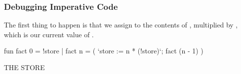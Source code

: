 \documentclass[aspectratio=169]{beamer}
\begin{document}
\begin{frame}[fragile]
  \frametitle{Debugging Imperative Code}

  \begin{minipage}[t][0.6in][t]{\textwidth}
  The first thing to happen is that we assign  to the contents
  of , multiplied by , which is our current value of
  .
  \end{minipage}

  \vspace{10pt}

  \begin{center}
    \begin{minipage}[t][1.7in][t]{0.6\textwidth}
      \vspace{\fill}
      \begin{codeblock}
        fun fact 0 = !store
          | fact n =
              ( `store := n * (!store)`;
                fact (n - 1)
              )
      \end{codeblock}
      \vspace{\fill}
    \end{minipage}
    \hfill\vline\hfill
    \begin{minipage}[t][1.7in][t]{0.3\textwidth}
      \centering
      {\hspace{-20pt}\color{gray} \large THE STORE}

      \vspace{\fill}
      \vspace{\fill}
    \end{minipage}
  \end{center}
\end{frame}
\end{document}
